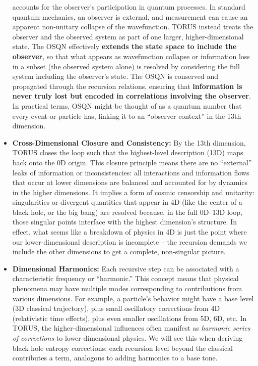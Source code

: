 \documentclass[]{article}
\begin{document}
\begin{itemize}
  accounts for the observer's participation in quantum processes. In
  standard quantum mechanics, an observer is external, and measurement
  can cause an apparent non-unitary collapse of the wavefunction. TORUS
  instead treats the observer and the observed system as part of one
  larger, higher-dimensional state. The OSQN effectively \textbf{extends
  the state space to include the observer}, so that what appears as
  wavefunction collapse or information loss in a subset (the observed
  system alone) is resolved by considering the full system including the
  observer's state. The OSQN is conserved and propagated through the
  recursion relations, ensuring that \textbf{information is never truly
  lost but encoded in correlations involving the observer}. In practical
  terms, OSQN might be thought of as a quantum number that every event
  or particle has, linking it to an ``observer context'' in the 13th
  dimension.
\item
  \textbf{Cross-Dimensional Closure and Consistency:} By the 13th
  dimension, TORUS closes the loop such that the highest-level
  description (13D) maps back onto the 0D origin. This closure principle
  means there are no ``external'' leaks of information or
  inconsistencies: all interactions and information flows that occur at
  lower dimensions are balanced and accounted for by dynamics in the
  higher dimensions. It implies a form of cosmic censorship and
  unitarity: singularities or divergent quantities that appear in 4D
  (like the center of a black hole, or the big bang) are resolved
  because, in the full 0D--13D loop, those singular points interface
  with the highest dimension's structure. In effect, what seems like a
  breakdown of physics in 4D is just the point where our
  lower-dimensional description is incomplete -- the recursion demands
  we include the other dimensions to get a complete, non-singular
  picture.
\item
  \textbf{Dimensional Harmonics:} Each recursive step can be associated
  with a characteristic frequency or ``harmonic.'' This concept means
  that physical phenomena may have multiple modes corresponding to
  contributions from various dimensions. For example, a particle's
  behavior might have a base level (3D classical trajectory), plus small
  oscillatory corrections from 4D (relativistic time effects), plus even
  smaller oscillations from 5D, 6D, etc. In TORUS, the
  higher-dimensional influences often manifest as \emph{harmonic series
  of corrections} to lower-dimensional physics. We will see this when
  deriving black hole entropy corrections: each recursion level beyond
  the classical contributes a term, analogous to adding harmonics to a
  base tone.
\end{itemize}
\end{document}
